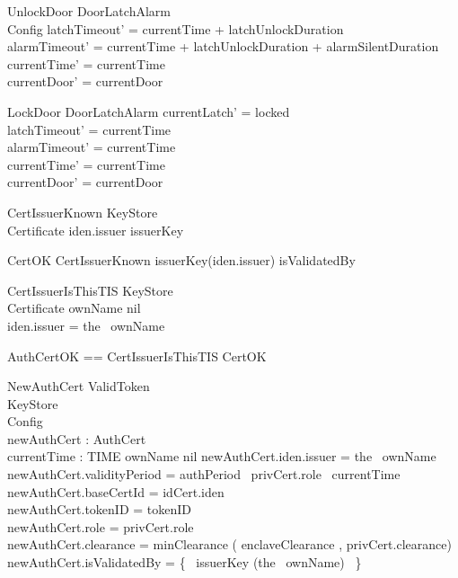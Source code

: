 \begin{schema}{UnlockDoor}
        \Delta DoorLatchAlarm
\\      Config
\where
        latchTimeout' = currentTime + latchUnlockDuration
\\      alarmTimeout' = currentTime + latchUnlockDuration + alarmSilentDuration
\\      currentTime' = currentTime
\\      currentDoor' = currentDoor
\end{schema}

\begin{schema}{LockDoor}
        \Delta DoorLatchAlarm
\where
        currentLatch' = locked
\\      latchTimeout' = currentTime
\\      alarmTimeout' = currentTime 
\\      currentTime' = currentTime
\\      currentDoor' = currentDoor
\end{schema}

\begin{schema}{CertIssuerKnown}
        KeyStore
\\      Certificate
\where
        iden.issuer \in \dom issuerKey
\end{schema}

\begin{schema}{CertOK}
        CertIssuerKnown
\where
        issuerKey(iden.issuer) \in isValidatedBy
\end{schema}

\begin{schema}{CertIssuerIsThisTIS}
        KeyStore
\\      Certificate
\where
        ownName \neq nil
\\      iden.issuer = the~ ownName
\end{schema}

\begin{zed}
        AuthCertOK == CertIssuerIsThisTIS \land CertOK
\end{zed}

\begin{schema}{NewAuthCert}
        ValidToken
\\      KeyStore
\\      Config
\\      newAuthCert : AuthCert
\\      currentTime : TIME
\where
        ownName \neq nil
\also
        newAuthCert.iden.issuer = the~ ownName
\\      newAuthCert.validityPeriod = authPeriod~ privCert.role~
currentTime
\\      newAuthCert.baseCertId = idCert.iden
\\      newAuthCert.tokenID = tokenID
\\      newAuthCert.role = privCert.role
\\      newAuthCert.clearance = minClearance ( enclaveClearance ,
privCert.clearance)
\\      newAuthCert.isValidatedBy = \{~ issuerKey (the~ ownName) ~\} 
\end{schema}

